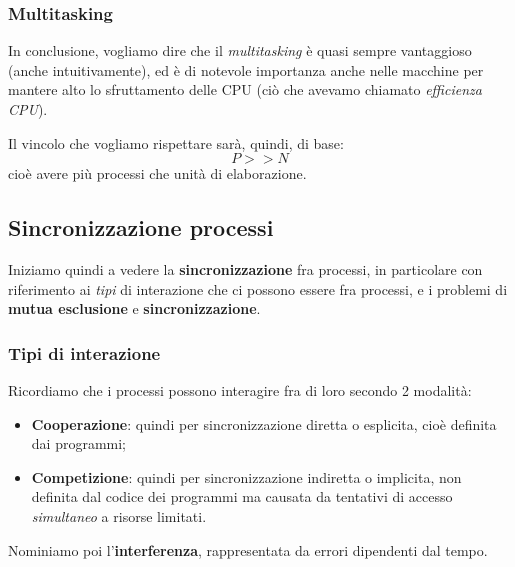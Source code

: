 \documentclass[a4paper,11pt]{article}
\begin{document}
\subsubsection{Multitasking}

In conclusione, vogliamo dire che il \textit{multitasking} è quasi sempre vantaggioso (anche intuitivamente), ed è di notevole importanza anche nelle macchine per mantere alto lo sfruttamento delle CPU (ciò che avevamo chiamato \textit{efficienza CPU}).

Il vincolo che vogliamo rispettare sarà, quindi, di base:
$$
P >> N
$$
cioè avere più processi che unità di elaborazione. 

\subsection{Sincronizzazione processi}
Iniziamo quindi a vedere la \textbf{sincronizzazione} fra processi, in particolare con riferimento ai \textit{tipi} di interazione che ci possono essere fra processi, e i problemi di \textbf{mutua esclusione} e \textbf{sincronizzazione}.

\subsubsection{Tipi di interazione}
Ricordiamo che i processi possono interagire fra di loro secondo 2 modalità:
\begin{itemize}
	\item \textbf{Cooperazione}: quindi per sincronizzazione diretta o esplicita, cioè definita dai programmi;
	\item \textbf{Competizione}: quindi per sincronizzazione indiretta o implicita, non definita dal codice dei programmi ma causata da tentativi di accesso \textit{simultaneo} a risorse limitati. 
\end{itemize}

Nominiamo poi l'\textbf{interferenza}, rappresentata da errori dipendenti dal tempo.
\end{document}

